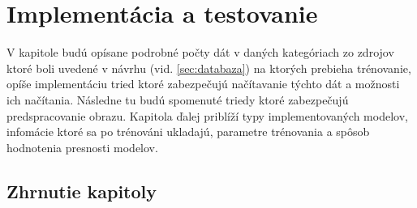 
\chapter{Implementácia a testovanie}

V kapitole budú opísane podrobné počty dát v daných kategóriach zo zdrojov ktoré boli uvedené v návrhu (vid. \ref{sec:databaza})
    na ktorých prebieha trénovanie, opíše implementáciu tried ktoré zabezpečujú načítavanie týchto dát a možnosti ich načítania.
Následne tu budú spomenuté triedy ktoré zabezpečujú predspracovanie obrazu.
Kapitola ďalej priblíží typy implementovaných modelov, infomácie ktoré sa po trénováni ukladajú, parametre trénovania a spôsob hodnotenia presnosti modelov.











\section{Zhrnutie kapitoly}



